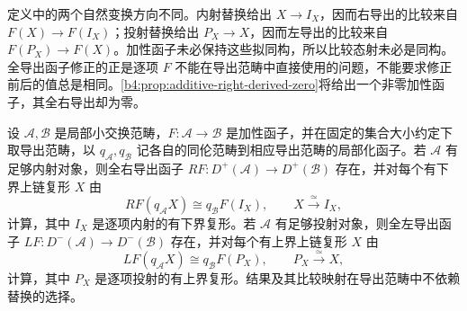 定义中的两个自然变换方向不同。内射替换给出 \(X\to I_X\)，因而右导出的比较来自 \(F(X)\to F(I_X)\)；投射替换给出 \(P_X\to X\)，因而左导出的比较来自 \(F(P_X)\to F(X)\)。加性函子未必保持这些拟同构，所以比较态射未必是同构。全导出函子修正的正是逐项 \(F\) 不能在导出范畴中直接使用的问题，不能要求修正前后的值总是相同。\cref{b4:prop:additive-right-derived-zero}将给出一个非零加性函子，其全右导出却为零。

\begin{theorem}\label{b4:thm:total-derived-functors}
	设 \(\mathcal A,\mathcal B\) 是局部小交换范畴，\(F:\mathcal A\to\mathcal B\) 是加性函子，并在固定的集合大小约定下取导出范畴，以 \(q_{\mathcal A},q_{\mathcal B}\) 记各自的同伦范畴到相应导出范畴的局部化函子。若 \(\mathcal A\) 有足够内射对象，则全右导出函子 \(RF:D^+(\mathcal A)\to D^+(\mathcal B)\) 存在，并对每个有下界上链复形 \(X\) 由
	\[
		RF(q_{\mathcal A}X)\cong q_{\mathcal B}F(I_X),\qquad X\xrightarrow{\simeq}I_X,
	\]
	计算，其中 \(I_X\) 是逐项内射的有下界复形。若 \(\mathcal A\) 有足够投射对象，则全左导出函子 \(LF:D^-(\mathcal A)\to D^-(\mathcal B)\) 存在，并对每个有上界上链复形 \(X\) 由
	\[
		LF(q_{\mathcal A}X)\cong q_{\mathcal B}F(P_X),\qquad P_X\xrightarrow{\simeq}X,
	\]
	计算，其中 \(P_X\) 是逐项投射的有上界复形。结果及其比较映射在导出范畴中不依赖替换的选择。
\end{theorem}
